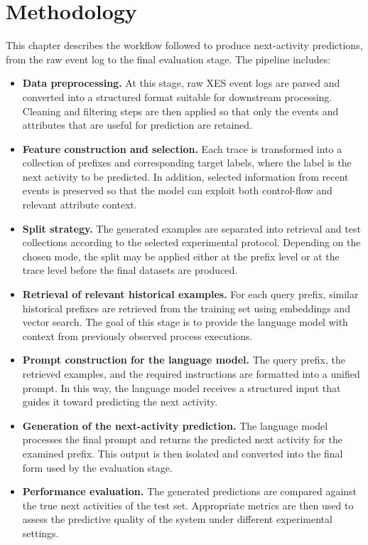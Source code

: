 \chapter{Methodology}
\noindent
This chapter describes the workflow followed to produce next-activity predictions, from the raw event log to the final evaluation stage. The pipeline includes:
\begin{itemize}
    \item \textbf{Data preprocessing.}
    At this stage, raw XES event logs are parsed and converted into a
    structured format suitable for downstream processing. Cleaning and
    filtering steps are then applied so that only the events and attributes
    that are useful for prediction are retained.

    \item \textbf{Feature construction and selection.}
    Each trace is transformed into a collection of prefixes and corresponding
    target labels, where the label is the next activity to be predicted. In
    addition, selected information from recent events is preserved so that the
    model can exploit both control-flow and relevant attribute context.

    \item \textbf{Split strategy.}
    The generated examples are separated into retrieval and test collections
    according to the selected experimental protocol. Depending on the chosen
    mode, the split may be applied either at the prefix level or at the trace
    level before the final datasets are produced.

    \item \textbf{Retrieval of relevant historical examples.}
    For each query prefix, similar historical prefixes are retrieved from the
    training set using embeddings and vector search. The goal of this stage is
    to provide the language model with context from previously observed
    process executions.

    \item \textbf{Prompt construction for the language model.}
    The query prefix, the retrieved examples, and the required instructions
    are formatted into a unified prompt. In this way, the language model
    receives a structured input that guides it toward predicting the next
    activity.

    \item \textbf{Generation of the next-activity prediction.}
    The language model processes the final prompt and returns the predicted
    next activity for the examined prefix. This output is then isolated and
    converted into the final form used by the evaluation stage.

    \item \textbf{Performance evaluation.}
    The generated predictions are compared against the true next activities of
    the test set. Appropriate metrics are then used to assess the predictive
    quality of the system under different experimental settings.
\end{itemize}

